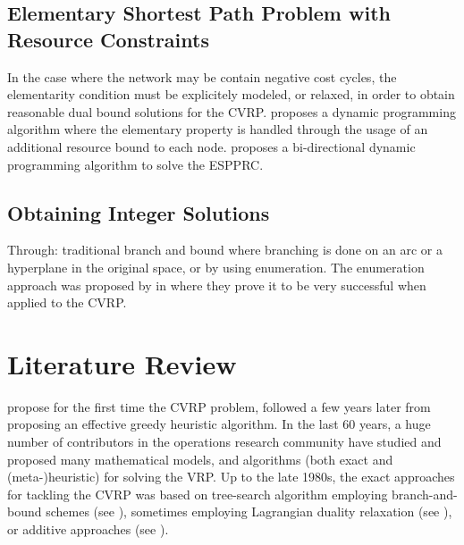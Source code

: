 \subsection{Elementary Shortest Path Problem with Resource Constraints}
In the case where the network may be contain negative cost cycles, the
elementarity condition must be explicitely modeled, or relaxed, in order
to obtain reasonable dual bound solutions for the CVRP.
\textcite{feillet2004} proposes a dynamic programming algorithm where
the elementary property is handled through the usage of an additional resource
bound to each node.
\textcite{righini2006} proposes a bi-directional dynamic programming algorithm to solve the ESPPRC.


\subsection{Obtaining Integer Solutions}

Through: traditional branch and bound where branching is done on an arc or a hyperplane in the original space, or by using enumeration.
The enumeration approach was proposed by \textcite{baldacci2008} in where they prove it to be very successful when applied to the CVRP.


\begin{comment}
\cite{jepsen2011}
The other method is enumeration which has proven to be very successful
for both cvrp[1] and vrptw[3]. In enumeration an upper bound U B and
a lower bound LB are used. From reduced cost fixing of a binary variable
it is know that any non basic column with a reduced cost strictly greater
than the gap ub − lb can not be part of an integer solution which is an
improvement of the current solution. This complete set of columns can be
found by solving an espprc using the dominance rule in proposition 5 and
bounding functions. Once we have added the columns with reduced cost less
than or equal to the gap the resulting problem can be solved as an integer
optimization problem.
\end{comment}

\section{Literature Review}
\label{sec:intro-literature-review}



\textcite{dantzig1959} propose for the first time the CVRP problem,
followed a few years later from \textcite{clarke1964} proposing
an effective greedy heuristic algorithm.
In the last 60 years, a huge number of contributors in
the operations research community have studied and proposed many
mathematical models, and algorithms (both exact and (meta-)heuristic)
for solving the VRP.
Up to the late 1980s, the exact approaches for tackling the CVRP was
based on tree-search algorithm employing branch-and-bound schemes
(see \textcite{christofides1969a, christofides1981, laporte1986}),
sometimes employing Lagrangian duality relaxation (see \textcite{fisher1994a, miller1995}),
or additive approaches (see \textcite{fischetti1994a, hadjiconstantinou1995}).

